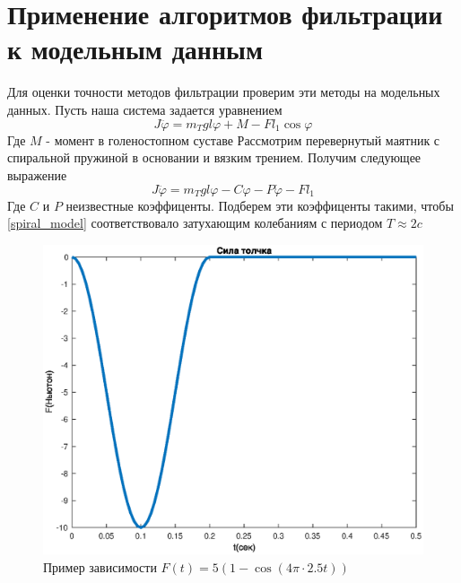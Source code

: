 \documentclass[a4paper,12pt, openany]{book}
\theoremstyle{plain} %
\theoremstyle{definition} %
\theoremstyle{remark} %
\numberwithin{equation}{chapter}
\begin{document}
{\section{Применение алгоритмов фильтрации к модельным данным}
Для оценки точности методов фильтрации проверим эти методы на модельных данных.
Пусть наша система задается уравнением
\[
    J\ddot{\varphi}=m_Tgl\varphi+M-Fl_1\cos \varphi
\]
Где $M$ - момент в голеностопном суставе
Рассмотрим перевернутый маятник с спиральной пружиной в основании и вязким трением.
Получим следующее выражение
\begin{equation}\label{spiral_model}
    J\ddot{\varphi}=m_Tgl\varphi-C\varphi-P\dot\varphi-Fl_1
\end{equation}
Где $C$ и $P$ неизвестные коэффиценты.
Подберем эти коэффиценты такими, чтобы \eqref{spiral_model} соответствовало затухающим колебаниям
с периодом $T\approx2c$
\begin{figure}[h!]
    \begin{center}
        \begin{minipage}[h]{0.48\linewidth}
            \includegraphics[width=1\linewidth]{push_model.eps}
            \caption{Пример зависимости \break $F(t)=5(1-\cos(4\pi\cdot2.5t))$}
        \end{minipage}
        \hfill
        \begin{minipage}[h]{0.48\linewidth}

\end{minipage}
\end{center}
\end{figure}}
\end{document}
